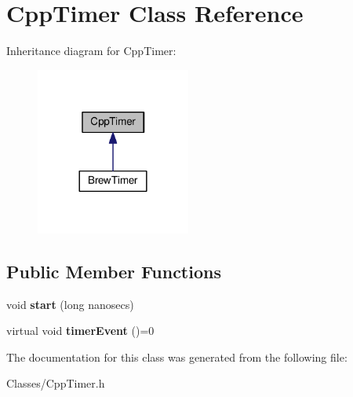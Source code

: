 \hypertarget{classCppTimer}{}\section{Cpp\+Timer Class Reference}
\label{classCppTimer}


Inheritance diagram for Cpp\+Timer\+:\nopagebreak
\begin{figure}[H]
\begin{center}
\leavevmode
\includegraphics[width=144pt]{classCppTimer__inherit__graph}
\end{center}
\end{figure}
\subsection*{Public Member Functions}
\begin{DoxyCompactItemize}
\item 
\mbox{\label{classCppTimer_a8d284721892e8e2665433f17045143e8}} 
void {\bfseries start} (long nanosecs)
\item 
\mbox{\label{classCppTimer_ac2665403595b6aee5f581d0ebfeb886c}} 
virtual void {\bfseries timer\+Event} ()=0
\end{DoxyCompactItemize}


The documentation for this class was generated from the following file\+:\begin{DoxyCompactItemize}
\item 
Classes/Cpp\+Timer.\+h\end{DoxyCompactItemize}
